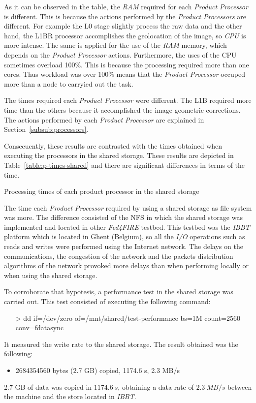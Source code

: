 As it can be observed in the table, the \emph{RAM} required for each
\emph{Product Processor} is different. This is because the actions performed by the \emph{Product Processors} are different. For example the L0
stage slightly process the raw data and the other hand, the L1BR processor
accomplishes the geolocation of the image, so \emph{CPU} is more intense. 
The same is applied for the use of the \emph{RAM} memory, which depends on the
\emph{Product Processor} actions.
Furthermore, the
uses of the \ac{CPU} sometimes overload 100\%. This is because the processing
required more than one cores. Thus workload was over 100\% means that the
\emph{Product Processor} occuped more than a node to carryied out the task.

The times required each \emph{Product Processor} were different. The L1B
required more time than the others because it accomplished the image
geometric corrections. The actions performed by each \emph{Product Processor} are
explained in Section~\ref{subsub:processors}. 



Consecuently, these results are contrasted with the times obtained when executing
the processors in the shared storage. These results are depicted in Table~\ref{table:p-times-shared}
and there are significant differences in terms of the time.

\begin{table}[!h]
  \centering
  {\small
  
  }
  \caption{Processing times of each product processor in the shared storage}
  \label{table:p-times-shared}
\end{table}

The time  each \emph{Product Processor} required by using a shared storage as
file system was more. The difference consisted of the \ac{NFS} in which
the shared storage was implemented and located
in other \emph{Fed4FIRE} testbed. This testbed was the \emph{IBBT} platform which is located in
Ghent (Belgium), so all the \emph{I/O} operations such as reads and writes were performed
using the Internet network. The delays on the communications, the congestion of
the network and the packets distribution algorithms of the network provoked more
delays than when performing locally or when using the shared storage.  

To corroborate that hypotesis, a performance test in the shared storage was carried out. This test
consisted of executing the following command:
\begin{itemize}
\item[>] dd if=/dev/zero of=/mnt/shared/test-performance bs=1M count=2560
  conv=fdatasync
\end{itemize}
It measured the write rate to the shared storage. The result obtained was the
following:
\begin{itemize}
\item 2684354560 bytes (2.7 GB) copied, 1174.6 s, 2.3 MB/s
\end{itemize}
2.7 GB of data was copied in $1174.6~s$, obtaining a data rate  of $2.3~MB/s$ between the
\bonfire machine and the store located in \emph{IBBT}. 

